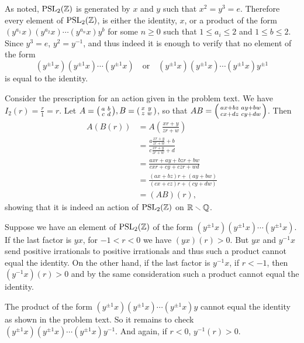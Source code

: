 \begin{solution}
	As noted, $\mathrm{PSL}_2(\mathbb{Z})$ is generated by $x$ and $y$ such that $x^2 = y^3 = e$. Therefore every element of $\mathrm{PSL}_2(\mathbb{Z})$, is either the identity, $x$, or a product of the form $(y^{a_1} x)(y^{a_2} x) \cdots (y^{a_n} x) y^b$ for some $n \geq 0$ such that $1 \leq a_i \leq 2$ and $1 \leq b \leq 2$. Since $y^3 = e$, $y^2 = y^{-1}$, and thus indeed it is enough to verify that no element of the form
	\[
		(y^{\pm1}x)(y^{\pm1}x)\cdots(y^{\pm1}x) \quad \text{or} \quad 	(y^{\pm1}x)(y^{\pm1}x)\cdots(y^{\pm1}x)y^{\pm1}
	\]
	is equal to the identity.
	
	Consider the prescription for an action given in the problem text. We have $I_2(r) = \frac{r}{1} = r$. Let
	$A =
	\begin{psmallmatrix}
		a & b \\
		c & d
	\end{psmallmatrix},
	B =
	\begin{psmallmatrix}
		x & y \\
		z & w
	\end{psmallmatrix}$,
	so that
	$AB =
	\begin{psmallmatrix}
		ax + bz & ay + bw \\
		cx + dz & cy + dw
	\end{psmallmatrix}$.
	Then
	\[
		\begin{aligned}
			A(B(r)) &= A(\frac{xr+y}{zr+w}) \\
			&= \frac{a \frac{xr+y}{zr+w} + b}{c \frac{xr+y}{zr+w} + d} \\
			&= \frac{axr+ay+bzr+bw}{cxr+cy+czr+wd} \\
			&= \frac{(ax+bz)r+(ay+bw)}{(cx+cz)r + (cy+dw)} \\
			&= (AB)(r) \text{,}
		\end{aligned}
	\]
	showing that it is indeed an action of $\mathrm{PSL}_2(\mathbb{Z})$ on $\mathbb{R} \smallsetminus \mathbb{Q}$.
	
	Suppose we have an element of $\mathrm{PSL}_2(\mathbb{Z})$ of the form $(y^{\pm1}x)(y^{\pm1}x)\cdots(y^{\pm1}x)$. If the last factor is $yx$, for $-1 < r < 0$ we have $(yx)(r) > 0$. But $yx$ and $y^{-1}x$ send positive irrationals to positive irrationals and thus such a product cannot equal the identity. On the other hand, if the last factor is $y^{-1}x$, if $r < -1$, then $(y^{-1}x)(r) > 0$ and by the same consideration such a product cannot equal the identity.
	
	The product of the form $(y^{\pm1}x)(y^{\pm1}x)\cdots(y^{\pm1}x)y$ cannot equal the identity as shown in the problem text. So it remains to check $(y^{\pm1}x)(y^{\pm1}x)\cdots(y^{\pm1}x)y^{-1}$. And again, if $r < 0$, $y^{-1}(r) > 0$.
\end{solution}

